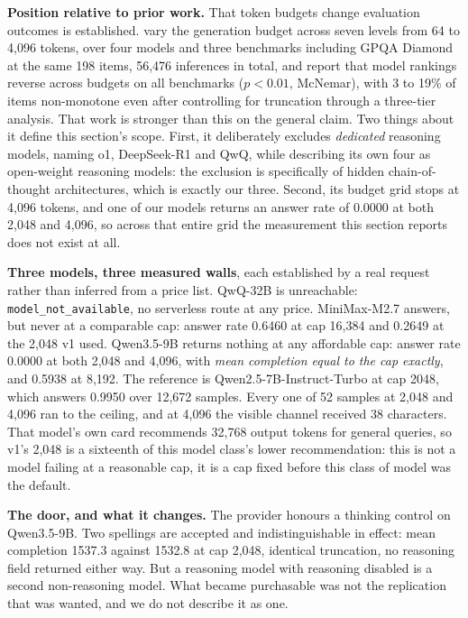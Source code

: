 \documentclass{article}
\begin{document}
\textbf{Position relative to prior work.} That token budgets change evaluation
outcomes is established. \citet{souza2026budget} vary the generation budget
across seven levels from 64 to 4,096 tokens, over four models and three
benchmarks including GPQA Diamond at the same 198 items, 56,476 inferences in
total, and report that model rankings reverse across budgets on all benchmarks
($p < 0.01$, McNemar), with 3 to 19\% of items non-monotone even after
controlling for truncation through a three-tier analysis. That work is stronger
than this on the general claim. Two things about it define this section's
scope. First, it deliberately excludes \emph{dedicated} reasoning models,
naming o1, DeepSeek-R1 and QwQ, while describing its own four as open-weight
reasoning models: the exclusion is specifically of hidden chain-of-thought
architectures, which is exactly our three. Second, its budget grid stops at
4,096 tokens, and one of our models returns an answer rate of 0.0000 at both
2,048 and 4,096, so across that entire grid the measurement this section
reports does not exist at all.

\textbf{Three models, three measured walls}, each established by a real request
rather than inferred from a price list. QwQ-32B is unreachable:
\texttt{model\_not\_available}, no serverless route at any price. MiniMax-M2.7
answers, but never at a comparable cap: answer rate 0.6460 at cap 16,384 and
0.2649 at the 2,048 v1 used. Qwen3.5-9B returns nothing at any affordable cap:
answer rate 0.0000 at both 2,048 and 4,096, with \emph{mean completion equal to
the cap exactly}, and 0.5938 at 8,192. The reference is
Qwen2.5-7B-Instruct-Turbo at cap 2048, which answers 0.9950 over 12,672
samples. Every one of 52 samples at 2,048 and 4,096 ran to the ceiling, and at
4,096 the visible channel received 38 characters. That model's own card
recommends 32,768 output tokens for general queries, so v1's 2,048 is a
sixteenth of this model class's lower recommendation: this is not a model
failing at a reasonable cap, it is a cap fixed before this class of model was
the default.

\textbf{The door, and what it changes.} The provider honours a thinking control
on Qwen3.5-9B. Two spellings are accepted and indistinguishable in effect: mean
completion 1537.3 against 1532.8 at cap 2,048, identical truncation, no
reasoning field returned either way. But a reasoning model with reasoning
disabled is a second non-reasoning model. What became purchasable was not the
replication that was wanted, and we do not describe it as one.
\end{document}

